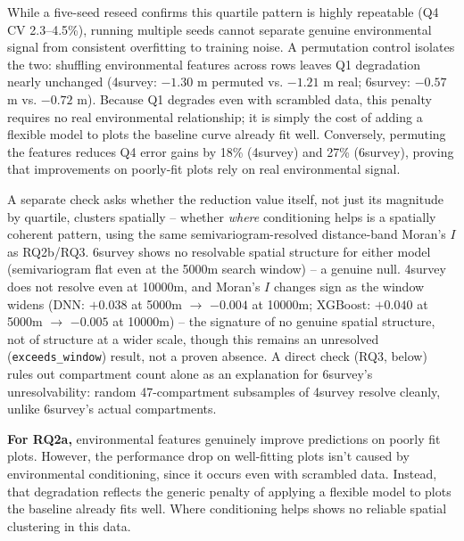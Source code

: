 While a five-seed reseed confirms this quartile pattern is highly repeatable (Q4 CV 2.3–4.5\%), running multiple seeds cannot separate genuine environmental signal from consistent overfitting to training noise. A permutation control isolates the two: shuffling environmental features across rows leaves Q1 degradation nearly unchanged (4survey: $-1.30$ m permuted vs. $-1.21$ m real; 6survey: $-0.57$ m vs. $-0.72$ m). Because Q1 degrades even with scrambled data, this penalty requires no real environmental relationship; it is simply the cost of adding a flexible model to plots the baseline curve already fit well. Conversely, permuting the features reduces Q4 error gains by 18\% (4survey) and 27\% (6survey), proving that improvements on poorly-fit plots rely on real environmental signal.

A separate check asks whether the reduction value itself, not just its magnitude by quartile, clusters spatially -- whether \emph{where} conditioning helps is a spatially coherent pattern, using the same semivariogram-resolved distance-band Moran's $I$ as RQ2b/RQ3. 6survey shows no resolvable spatial structure for either model (semivariogram flat even at the 5000m search window) -- a genuine null. 4survey does not resolve even at 10000m, and Moran's $I$ changes sign as the window widens (DNN: $+0.038$ at 5000m $\to$ $-0.004$ at 10000m; XGBoost: $+0.040$ at 5000m $\to$ $-0.005$ at 10000m) -- the signature of no genuine spatial structure, not of structure at a wider scale, though this remains an unresolved (\texttt{exceeds\_window}) result, not a proven absence. A direct check (RQ3, below) rules out compartment count alone as an explanation for 6survey's unresolvability: random 47-compartment subsamples of 4survey resolve cleanly, unlike 6survey's actual compartments. 

\textbf{For RQ2a,} environmental features genuinely improve predictions on poorly fit plots. However, the performance drop on well-fitting plots isn't caused by environmental conditioning, since it occurs even with scrambled data. Instead, that degradation reflects the generic penalty of applying a flexible model to plots the baseline already fits well. Where conditioning helps shows no reliable spatial clustering in this data.

